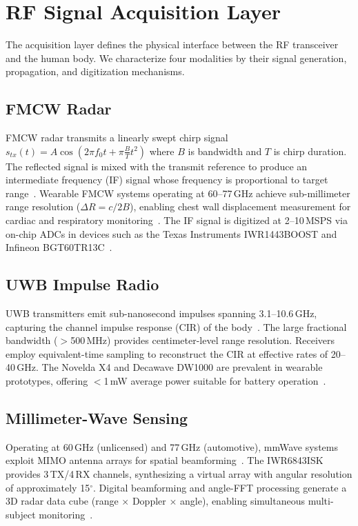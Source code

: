 \documentclass[journal,twoside]{IEEEtran}
\begin{document}
\section{RF Signal Acquisition Layer}

The acquisition layer defines the physical interface between the RF transceiver and the human body. We characterize four modalities by their signal generation, propagation, and digitization mechanisms.

\subsection{FMCW Radar}
FMCW radar transmits a linearly swept chirp signal $s_{tx}(t) = A\cos(2\pi f_0 t + \pi \frac{B}{T}t^2)$ where $B$ is bandwidth and $T$ is chirp duration. The reflected signal is mixed with the transmit reference to produce an intermediate frequency (IF) signal whose frequency is proportional to target range~\cite{ref_fmcw_contactless2025}. Wearable FMCW systems operating at 60--77\,GHz achieve sub-millimeter range resolution ($\Delta R = c/2B$), enabling chest wall displacement measurement for cardiac and respiratory monitoring~\cite{ref_highprec_mmwave2024}. The IF signal is digitized at 2--10\,MSPS via on-chip ADCs in devices such as the Texas Instruments IWR1443BOOST and Infineon BGT60TR13C~\cite{ref_multiscenario_mimo2025}.

\subsection{UWB Impulse Radio}
UWB transmitters emit sub-nanosecond impulses spanning 3.1--10.6\,GHz, capturing the channel impulse response (CIR) of the body~\cite{ref_uwb_overview2024}. The large fractional bandwidth ($>$500\,MHz) provides centimeter-level range resolution. Receivers employ equivalent-time sampling to reconstruct the CIR at effective rates of 20--40\,GHz. The Novelda X4 and Decawave DW1000 are prevalent in wearable prototypes, offering $<$1\,mW average power suitable for battery operation~\cite{ref_uwb_breast2024}.

\subsection{Millimeter-Wave Sensing}
Operating at 60\,GHz (unlicensed) and 77\,GHz (automotive), mmWave systems exploit MIMO antenna arrays for spatial beamforming~\cite{ref_mmwave_vital2025}. The IWR6843ISK provides 3\,TX/4\,RX channels, synthesizing a virtual array with angular resolution of approximately 15$^\circ$. Digital beamforming and angle-FFT processing generate a 3D radar data cube (range $\times$ Doppler $\times$ angle), enabling simultaneous multi-subject monitoring~\cite{ref_multipoint_mimo2024}.
\end{document}
